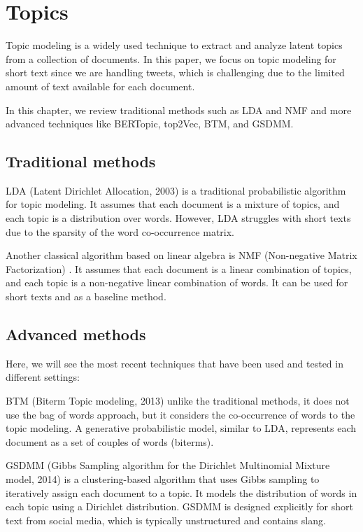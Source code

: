 \section[Topics]{Topics}
Topic modeling is a widely used technique to extract and analyze latent topics from a collection of documents. In this paper, we focus on topic modeling for short text since we are handling tweets, which is challenging due to the limited amount of text available for each document. 

In this chapter, we review traditional methods such as LDA and NMF and more advanced techniques like BERTopic, top2Vec, BTM, and GSDMM. 

\subsection{Traditional methods}
LDA (Latent Dirichlet Allocation, 2003)\cite{blei_latent_2003} is a traditional probabilistic algorithm for topic modeling. It assumes that each document is a mixture of topics, and each topic is a distribution over words. However, LDA struggles with short texts due to the sparsity of the word co-occurrence matrix.

Another classical algorithm based on linear algebra is NMF (Non-negative Matrix Factorization) \cite{lee_algorithms_2000}\cite{kuang_nonnegative_2015}. It assumes that each document is a linear combination of topics, and each topic is a non-negative linear combination of words. It can be used for short texts and as a baseline method.

\subsection{Advanced methods}
Here, we will see the most recent techniques that have been used and tested in different settings:

BTM (Biterm Topic modeling, 2013) \cite{yan_biterm_2013} unlike the traditional methods, it does not use the bag of words approach, but it considers the co-occurrence of words to the topic modeling. A generative probabilistic model, similar to LDA, represents each document as a set of couples of words (biterms).

GSDMM (Gibbs Sampling algorithm for the Dirichlet Multinomial Mixture model, 2014) \cite{yin_dirichlet_2014} is a clustering-based algorithm that uses Gibbs sampling to iteratively assign each document to a topic. It models the distribution of words in each topic using a Dirichlet distribution. GSDMM is designed explicitly for short text from social media, which is typically unstructured and contains slang.

